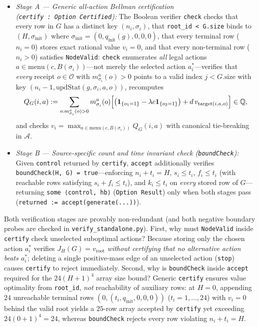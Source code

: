 \documentclass[11pt,letterpaper]{article}
\providecommand{\tightlist}{\setlength{\itemsep}{2pt}\setlength{\parskip}{0pt}}
\begin{document}
\begin{enumerate}
  \begin{itemize}
  \tightlist
  \item
    \emph{Stage A --- Generic all-action Bellman certification
    (\texttt{certify\ :\ Option\ Certified}):} The Boolean verifier
    \texttt{check} checks that every row in \(G\) has a distinct key
    \((n_i, \sigma_i)\), that \texttt{root\_id\ \textless{}\ G.size}
    binds to \((H, \sigma_{\mathrm{init}})\) where
    \(\sigma_{\mathrm{init}} = (0, q_{\mathrm{init}}(g), 0, 0, 0)\),
    that every terminal row (\(n_i = 0\)) stores exact rational value
    \(v_i = 0\), and that every non-terminal row (\(n_i > 0\)) satisfies
    \texttt{NodeValid}: \texttt{check} enumerates \emph{all} legal
    actions \(a \in \mathrm{menu}(c, B(\sigma_i))\)---not merely the
    selected action \(a_i^*\)---verifies that \emph{every} receipt
    \(o \in \mathcal{O}\) with \(m_{\sigma_i}^a(o) > 0\) points to a
    valid index \(j < G.\mathrm{size}\) with key
    \((n_i - 1, \mathrm{updStat}(g, \sigma_i, a, o))\), recomputes
    \[Q_G(i, a) := \sum_{o : m_{\sigma_i}^a(o) > 0} m_{\sigma_i}^a(o)\Bigl[\bigl(\mathbf{1}_{\{o_1 = 1\}} - \lambda c \mathbf{1}_{\{o_2 = 1\}}\bigr) + d\, v_{\mathrm{target}(i, a, o)}\Bigr] \in \mathbb{Q},\]
    and checks
    \(v_i = \max_{a \in \mathrm{menu}(c, B(\sigma_i))} Q_G(i, a)\) with
    canonical tie-breaking in \(\mathcal{A}\).
  \item
    \emph{Stage B --- Source-specific count and time invariant check
    (\texttt{boundCheck}):} Given \texttt{control} returned by
    \texttt{certify}, \texttt{accept} additionally verifies
    \texttt{boundCheck(H,\ G)\ =\ true}---enforcing \(n_i + t_i = H\),
    \(s_i \le t_i\), \(f_i \le t_i\) (with reachable rows satisfying
    \(s_i + f_i \le t_i\)), and \(k_i \le t_i\) on \emph{every} stored
    row of \(G\)---returning \texttt{some\ ⟨control,\ hb⟩}
    (\texttt{Option\ Result}) only when both stages pass
    (\texttt{returned\ :=\ accept(generate(...))}).
  \end{itemize}
\end{enumerate}

Both verification stages are provably non-redundant (and both negative
boundary probes are checked in \texttt{verify\_standalone.py}). First,
why must \texttt{NodeValid} inside \texttt{certify} check unselected
suboptimal actions? Because storing only the chosen action \(a_i^*\)
verifies \(J_H(G) = v_{\mathrm{root}}\) \emph{without certifying that no
alternative action beats \(a_i^*\)}; deleting a single positive-mass
edge of an unselected action (\texttt{stop}) causes \texttt{certify} to
reject immediately. Second, why is \texttt{boundCheck} inside
\texttt{accept} required for the \(24(H+1)^4\) array size bound? Generic
\texttt{certify} ensures value optimality from \texttt{root\_id},
\emph{not} reachability of auxiliary rows: at \(H = 0\), appending
\(24\) unreachable terminal rows
\((0, (t_i, q_{\mathrm{init}}, 0, 0, 0))\) (\(t_i = 1, \dots, 24\)) with
\(v_i = 0\) behind the valid root yields a \(25\)-row array accepted by
\texttt{certify} yet exceeding \(24(0+1)^4 = 24\), whereas
\texttt{boundCheck} rejects every row violating \(n_i + t_i = H\).
\end{document}
